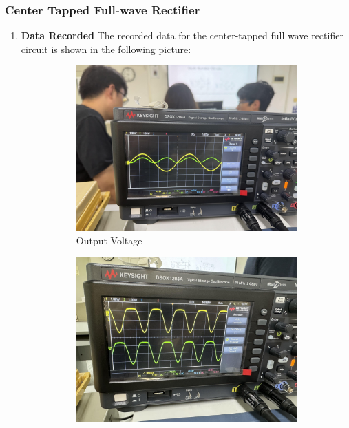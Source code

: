     \subsubsection{Center Tapped Full-wave Rectifier}
    \begin{enumerate}[I]
        \item \textbf{Data Recorded}\newline
            The recorded data for the center-tapped full wave rectifier circuit is shown in the following picture:
            \begin{figure}[H]
                \centering
                \begin{subfigure}[H]{0.4\textwidth}
                    \centering
                    \includegraphics[width=1\textwidth]{Experiment_03/Images/3.4_outPutVoltage.jpg}
                    \caption{Output Voltage}
                    \label{wave:3.4OV}
                \end{subfigure}
                \begin{subfigure}[H]{0.4\textwidth}
                    \centering
                    \includegraphics[width=1\textwidth]{Experiment_03/Images/3.4_diodeVoltage.jpg}

\end{subfigure}
\end{figure}
\end{enumerate}
